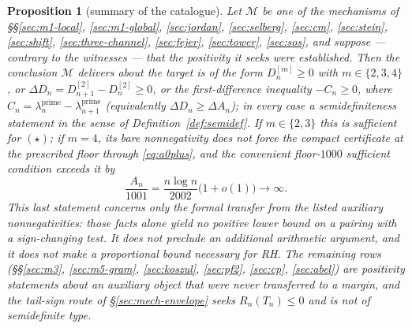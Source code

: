 \documentclass[11pt]{amsart}
\newtheorem{proposition}[theorem]{Proposition}
\theoremstyle{definition}
\theoremstyle{remark}
\theoremstyle{definition}
\begin{document}
\begin{proposition}[summary of the catalogue]\label{thm:classification}
Let $\mathcal M$ be one of the mechanisms of \S\S\ref{sec:m1-local}, \ref{sec:m1-global},
\ref{sec:jordan}, \ref{sec:selberg}, \ref{sec:cm}, \ref{sec:stein}, \ref{sec:shift},
\ref{sec:three-channel}, \ref{sec:fejer}, \ref{sec:tower}, \ref{sec:sos}, and suppose --- contrary to the
witnesses --- that the positivity it seeks were established. Then the conclusion $\mathcal M$
delivers about the target is of the form $D_n^{[m]}\ge0$ with $m\in\{2,3,4\}$, or
$\Delta D_n=D^{[2]}_{n+1}-D^{[2]}_n\ge0$, or the first-difference inequality $-C_n\ge0$, where
$C_n=\lambda_n^{\mathrm{prime}}-\lambda_{n+1}^{\mathrm{prime}}$ (equivalently
$\Delta D_n\ge\Delta A_n$); in every case a
semidefiniteness statement in the sense of Definition~\ref{def:semidef}. If $m\in\{2,3\}$ this is
sufficient for $(\star)$; if $m=4$, its bare nonnegativity does not force the compact certificate
at the prescribed floor through \eqref{eq:a0plus}, and the convenient floor-$1000$ sufficient
condition exceeds it by
\[
   \frac{A_n}{1001}=\frac{n\log n}{2002}\bigl(1+o(1)\bigr)\longrightarrow\infty .
\]
This last statement concerns only the formal transfer from the listed auxiliary
nonnegativities: those facts alone yield no positive lower bound on a pairing with a
sign-changing test. It does not preclude an additional arithmetic argument, and it does not make
a proportional bound necessary for RH. The remaining rows (\S\S\ref{sec:m3},
\ref{sec:m5-gram}, \ref{sec:koszul}, \ref{sec:pf2}, \ref{sec:cp}, \ref{sec:abel}) are positivity
statements about an auxiliary object that were never transferred to a margin, and the tail-sign
route of \S\ref{sec:mech-envelope} seeks $R_n(T_n)\le0$ and is not of semidefinite type.
\end{proposition}
\end{document}
